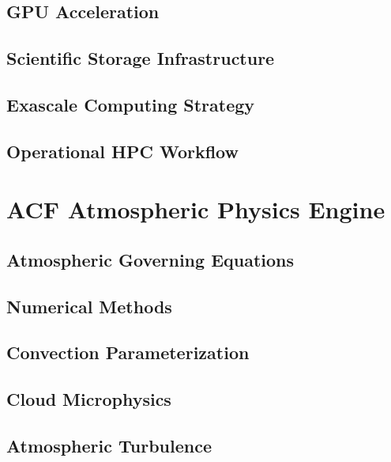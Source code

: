 \documentclass[11pt,a4paper,oneside]{report}
\begin{document}
\chapter{GPU Acceleration}



\chapter{Scientific Storage Infrastructure}



\chapter{Exascale Computing Strategy}



\chapter{Operational HPC Workflow}



\part{ACF Atmospheric Physics Engine}


\chapter{Atmospheric Governing Equations}



\chapter{Numerical Methods}



\chapter{Convection Parameterization}



\chapter{Cloud Microphysics}



\chapter{Atmospheric Turbulence}

\end{document}
